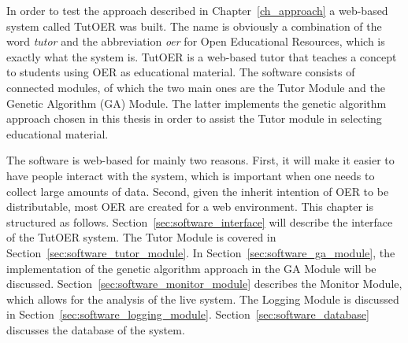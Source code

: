 In order to test the approach described in Chapter~\ref{ch_approach} a
web-based system called TutOER was built. The name is obviously a combination
of the word \emph{tutor} and the abbreviation \emph{oer} for Open Educational
Resources, which is exactly what the system is. TutOER is a web-based tutor
that teaches a concept to students using OER as educational material. The
software consists of connected modules, of which the two main ones are the
Tutor Module and the Genetic Algorithm (GA) Module. The latter implements the genetic algorithm
approach chosen in this thesis in order to assist the Tutor module in selecting
educational material.

The software is web-based for mainly two reasons. First, it will make
it easier to have people interact with the system, which is important when
one needs to collect large amounts of data. Second, given the inherit intention
of OER to be distributable, most OER are created for a web environment. This
chapter is structured as follows. Section~\ref{sec:software_interface} will
describe the interface of the TutOER system. The Tutor Module is covered in
Section~\ref{sec:software_tutor_module}. In
Section~\ref{sec:software_ga_module}, the implementation of the genetic
algorithm approach in the GA Module will be discussed.
Section~\ref{sec:software_monitor_module} describes the Monitor Module, which
allows for the analysis of the live system. The Logging Module is discussed in
Section~\ref{sec:software_logging_module}. Section~\ref{sec:software_database}
discusses the database of the system.
